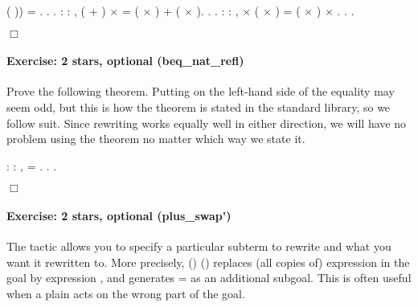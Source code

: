 \documentclass[12pt]{report}
\begin{document}
\begin{coqdoccode}
( ))\coqdoceol
\coqdocindent{1.00em}
= .\coqdoceol
\coqdocnoindent
{}.\coqdoceol
 .\coqdoceol
\coqdocemptyline
\coqdocnoindent
{}  : \coqdockw{\ensuremath{\forall}}    : ,\coqdoceol
\coqdocindent{1.00em}
( + ) \ensuremath{\times}  = ( \ensuremath{\times} ) + ( \ensuremath{\times} ).\coqdoceol
\coqdocnoindent
{}.\coqdoceol
 .\coqdoceol
\coqdocemptyline
\coqdocnoindent
{}  : \coqdockw{\ensuremath{\forall}}    : ,\coqdoceol
\coqdocindent{1.00em}
 \ensuremath{\times} ( \ensuremath{\times} ) = ( \ensuremath{\times} ) \ensuremath{\times} .\coqdoceol
\coqdocnoindent
{}.\coqdoceol
 .\coqdoceol
\end{coqdoccode}
\ensuremath{\Box} 

\paragraph{Exercise: 2 stars, optional (beq\_nat\_refl)}

 Prove the following theorem.  Putting  on the left-hand side
of the equality may seem odd, but this is how the theorem is stated in
the standard library, so we follow suit.  Since rewriting 
works equally well in either direction, we will have no 
problem using the theorem no matter which way we state it. \begin{coqdoccode}
\coqdocemptyline
\coqdocnoindent
{}  : \coqdockw{\ensuremath{\forall}}  : , \coqdoceol
\coqdocindent{1.00em}
 =   .\coqdoceol
\coqdocnoindent
{}.\coqdoceol
 .\coqdoceol
\end{coqdoccode}
\ensuremath{\Box} 

\paragraph{Exercise: 2 stars, optional (plus\_swap')}

 The  tactic allows you to specify a particular subterm to
   rewrite and what you want it rewritten to.  More precisely,
    ()  () replaces (all copies of) expression  in
   the goal by expression , and generates  =  as an additional
   subgoal. This is often useful when a plain  acts on the wrong
   part of the goal.  
\end{document}
